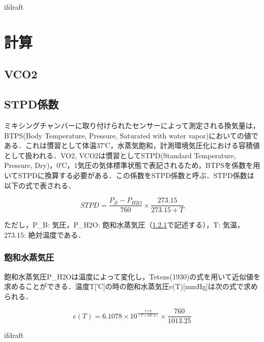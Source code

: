 \expandafter\ifx\csname ifdraft\endcsname\relax
 
\fi

\section{計算}

\subsection{VCO2}

\subsection{STPD係数}

ミキシングチャンバーに取り付けられたセンサーによって測定される換気量は，BTPS(Body Temperature, Pressure, Saturated with water vapor)においての値である．これは慣習として体温37℃，水蒸気飽和，計測環境気圧化における容積値として扱われる．VO2, VCO2は慣習としてSTPD(Standard Temperature, Pressure, Dry)，0℃，1気圧の気体標準状態で表記されるため，BTPSを係数を用いてSTPDに換算する必要がある．この係数をSTPD係数と呼ぶ．STPD係数は以下の式で表される．

\begin{equation}
  STPD = \frac{P_B - P_{H2O}}{760} \times　\frac{273.15}{273.15 + T}
\end{equation}

ただし，P_B: 気圧，P_{H2O}: 飽和水蒸気圧（\ref{sec:SWVP}で記述する），T: 気温，273.15: 絶対温度である．

\subsubsection{飽和水蒸気圧}
\label{sec:SWVP}

飽和水蒸気圧P_{H2O}は温度によって変化し，Tetens(1930)の式を用いて近似値を求めることができる．温度T[℃]の時の飽和水蒸気圧e(T)[mmHg]は次の式で求められる．

\begin{equation}
  e(T) = 6.1078 \times 10 ^ \frac{7.5T}{(T + 237.3)} \times \frac{760}{1013.25}
\end{equation}

\expandafter\ifx\csname ifdraft\endcsname\relax
  
\fi
